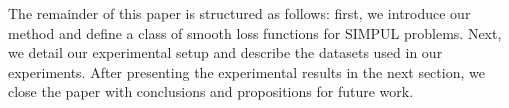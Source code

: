 The remainder of this paper is structured as follows: first, we introduce
our method and define a class of smooth loss functions for SIMPUL problems.
Next, we detail our experimental setup and describe the datasets used in our
experiments. After presenting the experimental results in the next section,
we close the paper with conclusions and propositions for future work.













